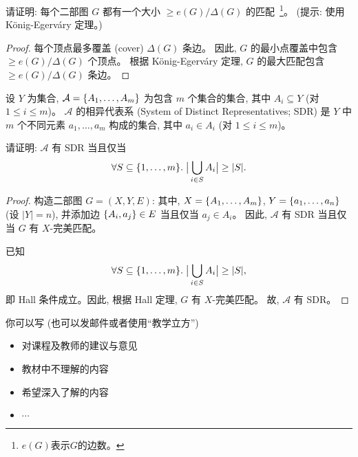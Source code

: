 \documentclass[a4paper, justified]{tufte-handout}
\begin{document}
\begin{problem}
  请证明: 每个二部图 $G$ 都有一个大小 $\ge e(G)/\Delta(G)$ 的匹配~\footnote{$e(G)$表示$G$的边数。}。
  (提示: 使用 K\"{o}nig-Egerv\'{a}ry 定理。)
\end{problem}

\begin{proof}
  每个顶点最多覆盖 (cover) $\Delta(G)$ 条边。
  因此, $G$ 的最小点覆盖中包含 $\ge e(G)/\Delta(G)$ 个顶点。
  根据 K\"{o}nig-Egerv\'{a}ry 定理, $G$ 的最大匹配包含 $\ge e(G)/\Delta(G)$ 条边。
\end{proof}

\begin{problem}
  设 $Y$ 为集合,
  $\mathcal{A} = \{A_{1}, \dots, A_{m}\}$
  为包含 $m$ 个集合的集合, 其中 $A_{i} \subseteq Y$ (对 $1 \le i \le m$)。
  $\mathcal{A}$ 的相异代表系 (System of Distinct Representatives; SDR)
  是 $Y$ 中 $m$ 个不同元素 $a_{1}, \dots, a_{m}$ 构成的集合,
  其中 $a_{i} \in A_{i}$ (对 $1 \le i \le m$)。

  \noindent 请证明: $\mathcal{A}$ 有 SDR 当且仅当
  \[
    \forall S \subseteq \{1, \dots, m\}.\;
      \big\lvert \bigcup_{i \in S} A_{i} \big\rvert \ge |S|.
  \]
\end{problem}

\begin{proof}
  构造二部图 $G = (X, Y, E)$:
  其中, $X = \{A_{1}, \dots, A_{m}\}$,
  $Y = \{a_{1}, \dots, a_{n}\}$ (设 $|Y| = n$),
  并添加边 $\{A_{i}, a_{j}\} \in E$ 当且仅当 $a_{j} \in A_{i}$。
  因此, $\mathcal{A}$ 有 SDR 当且仅当 $G$ 有 $X$-完美匹配。

  已知
  \[
    \forall S \subseteq \{1, \dots, m\}.\;
      \big\lvert \bigcup_{i \in S} A_{i} \big\rvert \ge |S|,
  \]
  即 Hall 条件成立。因此, 根据 Hall 定理, $G$ 有 $X$-完美匹配。
  故, $\mathcal{A}$ 有 SDR。
\end{proof}

\begincorrection

\beginfb

你可以写 (也可以发邮件或者使用``教学立方'')
\begin{itemize}
  \item 对课程及教师的建议与意见
  \item 教材中不理解的内容
  \item 希望深入了解的内容
  \item $\cdots$
\end{itemize}
\end{document}

